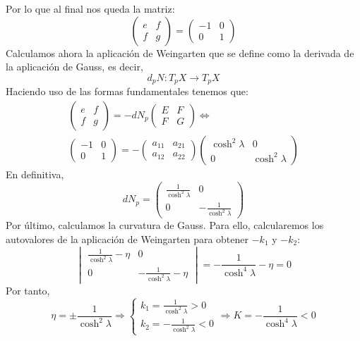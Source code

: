 Por lo que al final nos queda la matriz:
\[
    \begin{pmatrix} e & f\\ f & g \end{pmatrix} = \begin{pmatrix} -1 & 0\\ 0 &
1 \end{pmatrix}
\]
Calculamos ahora la aplicación de Weingarten que se define como la derivada de
la aplicación de Gauss, es decir,
\[
d_p N: T_p X \rightarrow T_p X
\]
Haciendo uso de las formas fundamentales tenemos que:
\begin{gather*}
    \begin{pmatrix} e & f\\ f & g \end{pmatrix} = -dN_p \begin{pmatrix} E & F\\
F & G\end{pmatrix} \Leftrightarrow\\
    \begin{pmatrix} -1 & 0\\ 0 & 1 \end{pmatrix} = -\begin{pmatrix} 
    a_{11} & a_{21}\\ a_{12} & a_{22} \end{pmatrix}
    \begin{pmatrix} \cosh^2 \lambda & 0\\ 0 & \cosh^2 \lambda\end{pmatrix}
\end{gather*}
En definitiva,
\[
    dN_p = \begin{pmatrix} \frac{1}{\cosh^2 \lambda} & 0\\
    0 & -\frac{1}{\cosh^2 \lambda}\end{pmatrix}
\]
Por último, calculamos la curvatura de Gauss. Para ello, calcularemos los
autovalores de la aplicación de Weingarten para obtener $-k_1$ y $-k_2$:
\[
    \begin{vmatrix} \frac{1}{\cosh^2 \lambda} - \eta & 0\\
    0 & -\frac{1}{\cosh^2 \lambda} - \eta \end{vmatrix} = -\frac{1}{\cosh^4
    \lambda} - \eta = 0
\]
Por tanto,
\[
\eta = \pm \frac{1}{\cosh^2 \lambda} \Rightarrow \begin{cases}
    k_1 = \frac{1}{\cosh^2 \lambda} > 0\\
    k_2 = -\frac{1}{\cosh^2 \lambda} < 0
\end{cases} \Rightarrow \boxed{K = - \frac{1}{\cosh^4 \lambda} < 0}
\]
